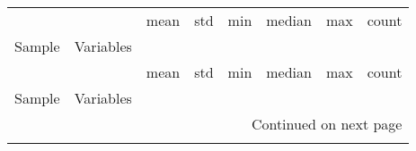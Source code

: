 \begin{longtable}[h!]{llrrrrrr}
\toprule
        &              &       mean &         std &    min &     median &          max &  count \\
Sample & Variables &            &             &        &            &              &        \\
\midrule
\endfirsthead

\toprule
        &              &       mean &         std &    min &     median &          max &  count \\
Sample & Variables &            &             &        &            &              &        \\
\midrule
\endhead
\midrule
\multicolumn{8}{r}{{Continued on next page}} \\
\midrule
\endfoot


\end{longtable}
